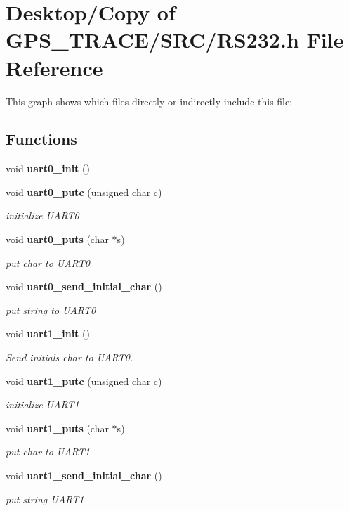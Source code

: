 \section{Desktop/Copy of GPS\_\-TRACE/SRC/RS232.h File Reference}
\label{_r_s232_8h}


This graph shows which files directly or indirectly include this file:\subsection*{Functions}
\begin{CompactItemize}
\item 
void {\bf uart0\_\-init} ()
\item 
void {\bf uart0\_\-putc} (unsigned char c)
\begin{CompactList}\small\item\em initialize UART0 \item\end{CompactList}\item 
void {\bf uart0\_\-puts} (char $\ast$s)
\begin{CompactList}\small\item\em put char to UART0 \item\end{CompactList}\item 
void {\bf uart0\_\-send\_\-initial\_\-char} ()
\begin{CompactList}\small\item\em put string to UART0 \item\end{CompactList}\item 
void {\bf uart1\_\-init} ()
\begin{CompactList}\small\item\em Send initials char to UART0. \item\end{CompactList}\item 
void {\bf uart1\_\-putc} (unsigned char c)
\begin{CompactList}\small\item\em initialize UART1 \item\end{CompactList}\item 
void {\bf uart1\_\-puts} (char $\ast$s)
\begin{CompactList}\small\item\em put char to UART1 \item\end{CompactList}\item 
void {\bf uart1\_\-send\_\-initial\_\-char} ()
\begin{CompactList}\small\item\em put string UART1 \item\end{CompactList}\end{CompactItemize}


